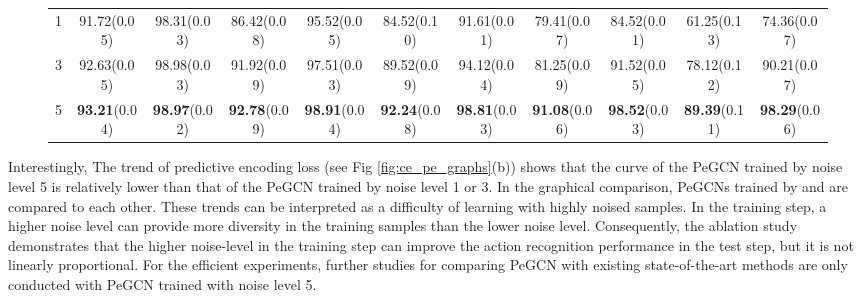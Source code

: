 \documentclass[runningheads]{llncs}
\begin{document}
\begin{figure*}[t]
\begin{minipage}{\linewidth}
{\begin{tabular}{c c c c c c c c cc c}
		\midrule
		  1 &  91.72(0.05)&	98.31(0.03)&	86.42(0.08)&	95.52(0.05)&	84.52(0.10)&	91.61(0.01)&	79.41(0.07)&	84.52(0.01) &	61.25(0.13)&	74.36(0.07)\\
		  3 &  92.63(0.05)&	98.98(0.03)&	91.92(0.09)&	97.51(0.03)&	89.52(0.09)&	94.12(0.04)&	81.25(0.09)&	91.52(0.05) &	78.12(0.12)&	90.21(0.07)\\
		  5 & \textbf{93.21}(0.04)& \textbf{98.97}(0.02)&	\textbf{92.78}(0.09)&	\textbf{98.91}(0.04)&	\textbf{92.24}(0.08)&	\textbf{98.81}(0.03)&	\textbf{91.08}(0.06)&	\textbf{98.52}(0.03) &	\textbf{89.39}(0.11)&	\textbf{98.29}(0.06)  \\
		\midrule
		\bottomrule
	\end{tabular}
	}
\end{minipage}
\label{tbl:abl} 
\vspace{-4ex}
\end{figure*}

Interestingly, The trend of predictive encoding loss (see Fig \ref{fig:ce_pe_graphs}(b)) shows that the curve of the PeGCN trained by noise level 5 is relatively lower than that of the PeGCN trained by noise level 1 or 3. In the graphical comparison, PeGCNs trained by  and   are compared to each other. These trends can be interpreted as a difficulty of learning with highly noised samples. In the training step, a higher noise level can provide more diversity in the training samples than the lower noise level. Consequently, the ablation study demonstrates that the higher noise-level in the training step can improve the action recognition performance in the test step, but it is not linearly proportional. For the efficient experiments, further studies for comparing PeGCN with existing state-of-the-art methods are only conducted with PeGCN trained with noise level 5. 
\end{document}
